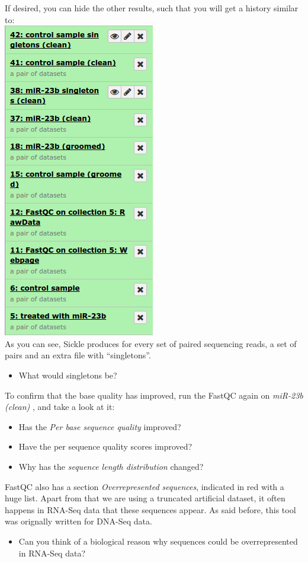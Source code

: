 If desired, you can hide the other results, such that you will get a history similar to:\\
\includegraphics[scale=0.55]{figures/qc_07.png}\\
As you can see, Sickle produces for every set of paired sequencing reads, a set of pairs and an extra file with ``singletons''.
\begin{itemize}
	\item What would singletons be?
\end{itemize}
To confirm that the base quality has improved, run the FastQC again on \textit{ miR-23b (clean) }, and take a look at it:
\begin{itemize}
	\item Has the \textit{Per base sequence quality} improved?
	\item Have the per sequence quality scores improved?
	\item Why has the \textit{sequence length distribution} changed?
\end{itemize}
FastQC also has a section \textit{Overrepresented sequences}, indicated in red with a huge list. Apart from that we are using a truncated artificial dataset, it often happens in RNA-Seq data that these sequences appear. As said before, this tool was orignally written for DNA-Seq data.
\begin{itemize}
	\item Can you think of a biological reason why sequences could be overrepresented in RNA-Seq data?
\end{itemize}

